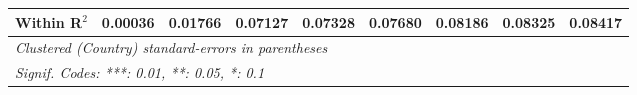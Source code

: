 \begin{table}[htbp]
\begin{tabular}{lcccccccc}
      Within R$^2$                                                     & 0.00036  & 0.01766  & 0.07127        & 0.07328        & 0.07680        & 0.08186         & 0.08325         & 0.08417\\  
      \midrule \midrule
      \multicolumn{9}{l}{\emph{Clustered (Country) standard-errors in parentheses}}\\
      \multicolumn{9}{l}{\emph{Signif. Codes: ***: 0.01, **: 0.05, *: 0.1}}\\
   \end{tabular}
\end{table}


